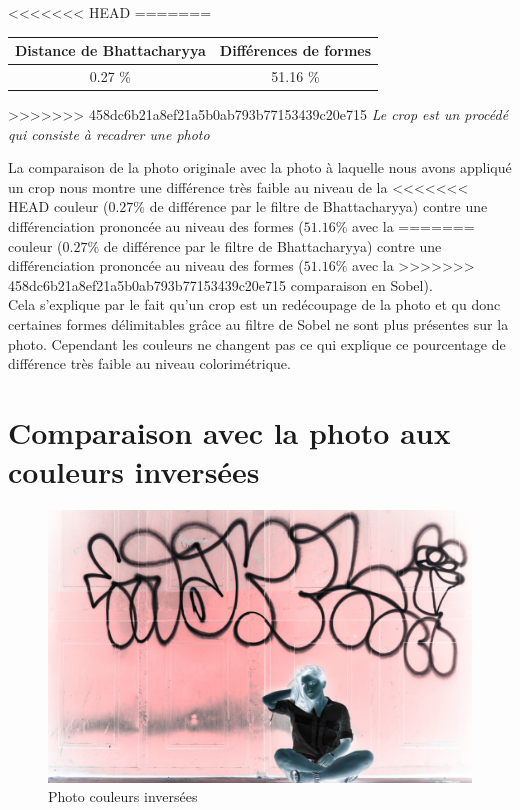 \documentclass[]{article}
\begin{document}
\begin{description}
<<<<<<< HEAD
=======
\begin{center}
\begin{tabular}{|c|c|}
  \hline
  Distance de Bhattacharyya & Différences de formes \\
  \hline
  0.27 \% & 51.16 \% \\
  \hline
\end{tabular}
\end{center}


>>>>>>> 458dc6b21a8ef21a5b0ab793b77153439c20e715
\emph{Le crop est un procédé qui consiste à recadrer une photo}

La comparaison de la photo originale avec la photo à laquelle nous avons
appliqué un crop nous montre une différence très faible au niveau de la
<<<<<<< HEAD
couleur ($0.27\%$ de différence par le filtre de Bhattacharyya) contre
une différenciation prononcée au niveau des formes ($51.16\%$ avec la
=======
couleur ($0.27 \%$ de différence par le filtre de Bhattacharyya) contre
une différenciation prononcée au niveau des formes ($51.16 \%$ avec la
>>>>>>> 458dc6b21a8ef21a5b0ab793b77153439c20e715
comparaison en Sobel). \\
Cela s'explique par le fait qu'un crop est un redécoupage de la photo et qu
donc certaines formes délimitables grâce au filtre de Sobel ne sont plus
présentes sur la photo. Cependant les couleurs ne changent pas ce qui explique
ce pourcentage de différence très faible au niveau colorimétrique.

\newpage

\section{Comparaison avec la photo aux couleurs
inversées}\label{comparaison-avec-la-photo-aux-couleurs-inversuxe9es}

\begin{figure}[htbp]
\centering
\includegraphics{photos/inverse.jpg}
\caption{Photo couleurs inversées}
\end{figure}


\end{description}
\end{document}
